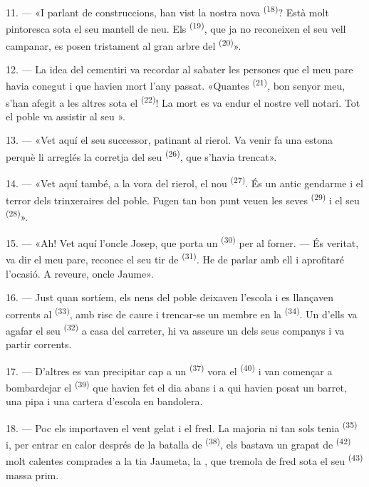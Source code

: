 11. --- «I parlant de construccions, han vist la nostra nova 
\textsuperscript{(18)}? Està molt pintoresca sota el seu mantell de neu. Els
 \textsuperscript{(19)}, que ja no reconeixen el seu vell campanar,
es posen tristament al gran arbre del 
\textsuperscript{(20)}».

12. --- La idea del cementiri va recordar al sabater les persones que el meu pare
havia conegut i que havien mort l'any passat. «Quantes 
\textsuperscript{(21)}, bon senyor meu, s'han afegit a les altres sota el
 \textsuperscript{(22)}! La mort es va endur el nostre vell notari.
Tot el poble va assistir al seu ».

13. --- «Vet aquí el seu successor, patinant al rierol. Va venir fa una estona
perquè li arreglés la corretja del seu  \textsuperscript{(26)}, que
s'havia trencat».

14. --- «Vet aquí també, a la vora del rierol, el nou 
\textsuperscript{(27)}. És un antic gendarme i el terror dels trinxeraires del
poble. Fugen tan bon punt veuen les seves 
\textsuperscript{(29)} i el seu  \textsuperscript{(28)}».

15. --- «Ah! Vet aquí l'oncle Josep, que porta un  \textsuperscript{(30)} per al forner. --- És veritat, va dir el meu pare,
reconec el seu tir de  \textsuperscript{(31)}. He de parlar amb ell
i aprofitaré l'ocasió. A reveure, oncle Jaume».

16. --- Just quan sortíem, els nens del poble deixaven l'escola i es llançaven
corrents al  \textsuperscript{(33)}, amb risc de caure i
trencar-se un membre en la  \textsuperscript{(34)}. Un d'ells va
agafar el seu  \textsuperscript{(32)} a casa del carreter, hi va
asseure un dels seus companys i va partir corrents.

17. --- D'altres es van precipitar cap a un 
\textsuperscript{(37)} vora el  \textsuperscript{(40)} i van començar
a bombardejar el  \textsuperscript{(39)} que havien fet el dia
abans i a qui havien posat un barret, una pipa i una cartera d'escola en
bandolera.

18. --- Poc els importaven el vent gelat i el fred. La majoria ni tan sols tenia
 \textsuperscript{(35)} i, per entrar en calor després de la
batalla de  \textsuperscript{(38)}, els bastava un grapat de
 \textsuperscript{(42)} molt calentes comprades a la tia Jaumeta,
la , que tremola de fred sota el seu 
\textsuperscript{(43)} massa prim.

